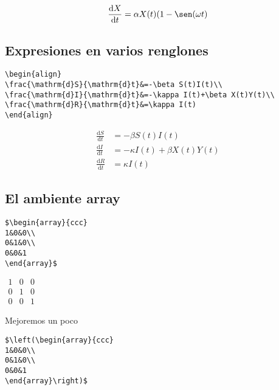 \documentclass{article}
\begin{document}
\begin{equation*}
\frac{\mathrm{d}X}{\mathrm{d}t}=\alpha X(t)(1-\sen(\omega t)
\end{equation*}

\subsection{Expresiones en varios renglones}

\begin{verbatim}
\begin{align}
\frac{\mathrm{d}S}{\mathrm{d}t}&=-\beta S(t)I(t)\\
\frac{\mathrm{d}I}{\mathrm{d}t}&=-\kappa I(t)+\beta X(t)Y(t)\\
\frac{\mathrm{d}R}{\mathrm{d}t}&=\kappa I(t)
\end{align}
\end{verbatim}

\begin{align}
\frac{\mathrm{d}S}{\mathrm{d}t}&=-\beta S(t)I(t)\\
\frac{\mathrm{d}I}{\mathrm{d}t}&=-\kappa I(t)+\beta X(t)Y(t)\\
\frac{\mathrm{d}R}{\mathrm{d}t}&=\kappa I(t)
\end{align}

\subsection{El ambiente array}

\begin{verbatim}
$\begin{array}{ccc}
1&0&0\\
0&1&0\\
0&0&1
\end{array}$
\end{verbatim}

$\begin{array}{ccc}
1&0&0\\
0&1&0\\
0&0&1
\end{array}$

Mejoremos un poco

\begin{verbatim}
$\left(\begin{array}{ccc}
1&0&0\\
0&1&0\\
0&0&1
\end{array}\right)$
\end{verbatim}
\end{document}
